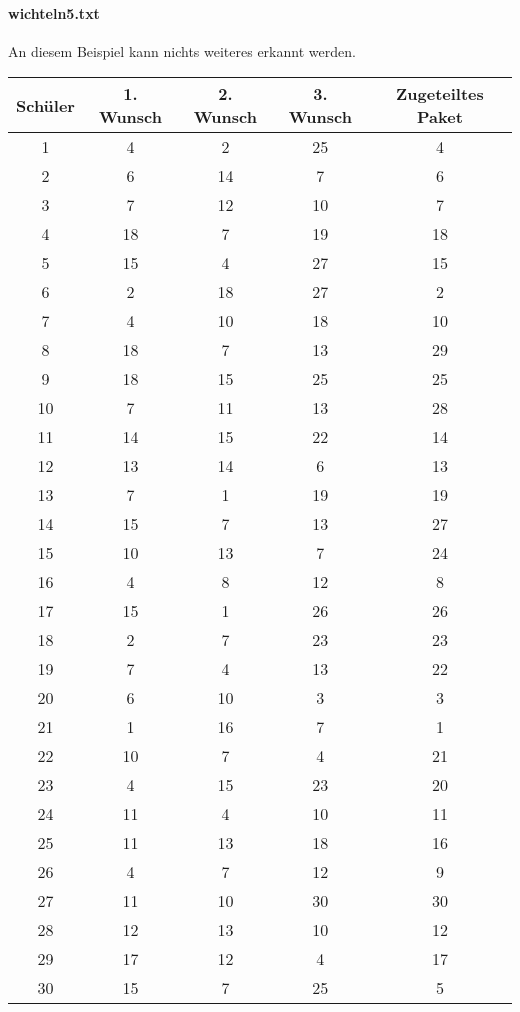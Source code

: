 \documentclass[a4paper,10pt,ngerman]{scrartcl}
\begin{document}
\paragraph{wichteln5.txt}
An diesem Beispiel kann nichts weiteres erkannt werden.
\begin{longtable}[c]{c|c|c|c|c}
    Schüler & 1. Wunsch & 2. Wunsch & 3. Wunsch & Zugeteiltes Paket \\
    \hline
    \endhead
    1 & 4 & 2 & 25 & 4 \\
    2 & 6 & 14 & 7 & 6 \\
    3 & 7 & 12 & 10 & 7 \\
    4 & 18 & 7 & 19 & 18 \\
    5 & 15 & 4 & 27 & 15 \\
    6 & 2 & 18 & 27 & 2 \\
    7 & 4 & 10 & 18 & 10 \\
    8 & 18 & 7 & 13 & 29 \\
    9 & 18 & 15 & 25 & 25 \\
    10 & 7 & 11 & 13 & 28 \\
    11 & 14 & 15 & 22 & 14 \\
    12 & 13 & 14 & 6 & 13 \\
    13 & 7 & 1 & 19 & 19 \\
    14 & 15 & 7 & 13 & 27 \\
    15 & 10 & 13 & 7 & 24 \\
    16 & 4 & 8 & 12 & 8 \\
    17 & 15 & 1 & 26 & 26 \\
    18 & 2 & 7 & 23 & 23 \\
    19 & 7 & 4 & 13 & 22 \\
    20 & 6 & 10 & 3 & 3 \\
    21 & 1 & 16 & 7 & 1 \\
    22 & 10 & 7 & 4 & 21 \\
    23 & 4 & 15 & 23 & 20 \\
    24 & 11 & 4 & 10 & 11 \\
    25 & 11 & 13 & 18 & 16 \\
    26 & 4 & 7 & 12 & 9 \\
    27 & 11 & 10 & 30 & 30 \\
    28 & 12 & 13 & 10 & 12 \\
    29 & 17 & 12 & 4 & 17 \\
    30 & 15 & 7 & 25 & 5
\end{longtable}
\end{document}
